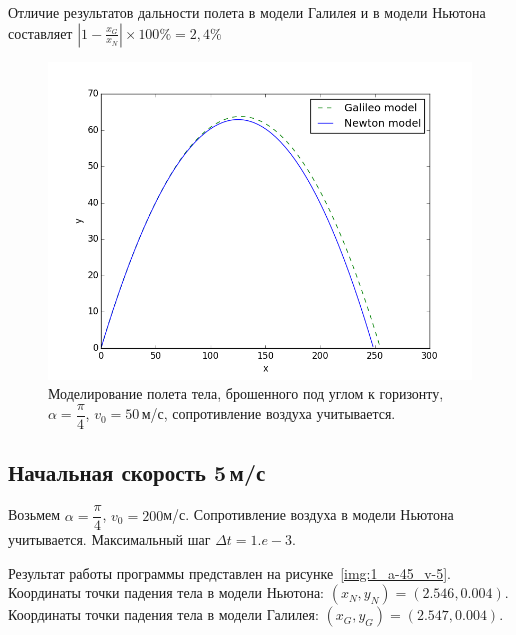 \documentclass[14pt,russian]{extarticle}
\begin{document}
Отличие результатов дальности полета в модели Галилея и в модели Ньютона составляет $|1-\frac{x_G}{x_N}| \times 100\% = 2,4\% $
\begin{figure}[h!]
	\centering
		\includegraphics[width=1\linewidth]{img/1_a-45_v-50.png}
	\caption{Моделирование полета тела, брошенного под углом к горизонту, $\alpha = \dfrac{\pi}{4}$, $v_0 = 50\,$м/с, сопротивление воздуха учитывается.}
	\label{img:1_a-45_v-50}
\end{figure}
\subsection{Начальная скорость 5\,м/с}
Возьмем $\alpha = \dfrac{\pi}{4}$, $v_0 = 200$м/с. Сопротивление воздуха в модели Ньютона учитывается. Максимальный шаг $\Delta t=1.e-3$.

Результат работы программы представлен на рисунке~\ref{img:1_a-45_v-5}.\\
Координаты точки падения тела в модели Ньютона: $(x_N, y_N) = (2.546, 0.004)$. \\
Координаты точки падения тела в модели Галилея: $(x_G, y_G) = (2.547, 0.004)$.
\end{document}
